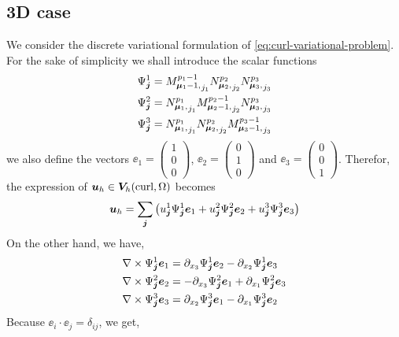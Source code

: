 \subsection{3D case}
We consider the discrete variational formulation of \eqref{eq:curl-variational-problem}. 
For the sake of simplicity we shall introduce the scalar functions
\begin{align*}
  \Psi^1_{\bm{j}} = {M_{\boldsymbol{\mu}_1-1,}^{p_1-1}}_{j_1} {N_{\boldsymbol{\mu}_2,}^{p_2}}_{j_2} {N_{\boldsymbol{\mu}_3,}^{p_3}}_{j_3} 
  \\
  \Psi^2_{\bm{j}} = {N_{\boldsymbol{\mu}_1,}^{p_1}}_{j_1} {M_{\boldsymbol{\mu}_2-1,}^{p_2-1}}_{j_2} {N_{\boldsymbol{\mu}_3,}^{p_3}}_{j_3}  
  \\
  \Psi^3_{\bm{j}} = {N_{\boldsymbol{\mu}_1,}^{p_1}}_{j_1} {N_{\boldsymbol{\mu}_2,}^{p_2}}_{j_2} {M_{\boldsymbol{\mu}_3-1,}^{p_3-1}}_{j_3}  
\end{align*}
we also define the vectors $\ee_1 = \begin{pmatrix} 1 \\ 0 \\ 0 \end{pmatrix}$, $\ee_2 = \begin{pmatrix} 0 \\ 1 \\ 0 \end{pmatrix}$ and $\ee_3 = \begin{pmatrix} 0 \\ 0 \\ 1 \end{pmatrix}$. Therefor, the expression of $\bm{u}_h \in \bm{V}_h(\mbox{curl}, \Omega)$ becomes
\begin{align*}
  \bm{u}_h = \sum\limits_{\bm{j}} \left( 
    u_{\bm{j}}^1 \Psi^1_{\bm{j}} \bm{e}_1 
  + u_{\bm{j}}^2 \Psi^2_{\bm{j}} \bm{e}_2 
  + u_{\bm{j}}^3 \Psi^3_{\bm{j}} \bm{e}_3 
  \right)
\end{align*}
On the other hand, we have,
\begin{align*}
 \nabla \times \Psi^{1}_{\bm{j}} \bm{e}_{1} &= 
   \partial_{x_3} \Psi^{1}_{\bm{j}} \bm{e}_2 
 - \partial_{x_2} \Psi^{1}_{\bm{j}} \bm{e}_3
 \\
 \nabla \times \Psi^{2}_{\bm{j}} \bm{e}_{2} &= 
 - \partial_{x_3} \Psi^{2}_{\bm{j}} \bm{e}_1
 + \partial_{x_1} \Psi^{2}_{\bm{j}} \bm{e}_3
 \\
 \nabla \times \Psi^{3}_{\bm{j}} \bm{e}_{3} &= 
   \partial_{x_2} \Psi^{3}_{\bm{j}} \bm{e}_1 
 - \partial_{x_1} \Psi^{3}_{\bm{j}} \bm{e}_2
\end{align*}
Because $\ee_i \cdot \ee_j = \delta_{ij}$, we get, 
